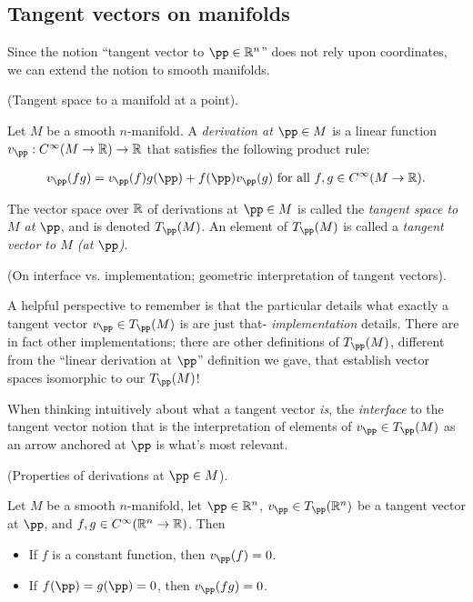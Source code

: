 \newpage

\subsection*{Tangent vectors on manifolds}

Since the notion ``tangent vector to $\pp \in \R^n$'' does not rely upon coordinates, we can extend the notion to smooth manifolds.

\begin{defn}
     (Tangent space to a manifold at a point). 
    
    Let $M$ be a smooth $n$-manifold. A \textit{derivation at $\pp \in M$} is a linear function $v_\pp:C^\infty(M \rightarrow \R) \rightarrow \R$ that satisfies the following product rule:
    
    \begin{align*}
        v_\pp(fg) = v_\pp(f)g(\pp) + f(\pp)v_\pp(g) \text{ for all $f, g \in C^\infty(M \rightarrow \R)$}.
    \end{align*}
    
    The vector space over $\mathbb{R}$ of derivations at $\pp \in M$ is called the \textit{tangent space to $M$ at $\pp$}, and is denoted $T_\pp(M)$. An element of $T_\pp(M)$ is called a \textit{tangent vector to $M$ (at $\pp$)}.
\end{defn}

\begin{remark}
    (On interface vs. implementation; geometric interpretation of tangent vectors).

    A helpful perspective to remember is that the particular details what exactly a tangent vector $v_\pp \in T_\pp(M)$ is are just that- \textit{implementation} details. There are in fact other implementations; there are other definitions of $T_\pp(M)$, different from the ``linear derivation at $\pp$'' definition we gave, that establish vector spaces isomorphic to our $T_\pp(M)$!    
    
    When thinking intuitively about what a tangent vector \textit{is}, the \textit{interface} to the tangent vector notion that is the interpretation of elements of $v_\pp \in T_\pp(M)$ as an arrow anchored at $\pp$ is what's most relevant.
\end{remark}

\begin{theorem}
     (Properties of derivations at $\pp \in M$).
    
    Let $M$ be a smooth $n$-manifold, let $\pp \in \R^n$, $v_\pp \in T_\pp(\R^n)$ be a tangent vector at $\pp$, and $f, g \in C^\infty(\mathbb{R}^n \rightarrow \mathbb{R})$. Then
    
    \begin{itemize}
        \item If $f$ is a constant function, then $v_\pp(f) = 0$.
        \item If $f(\pp) = g(\pp) = 0$, then $v_\pp(fg) = 0$.
    \end{itemize}
\end{theorem}
    
